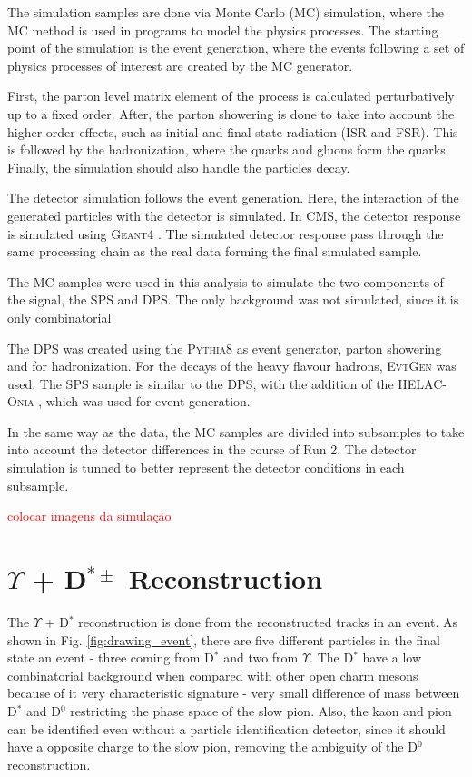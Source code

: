 The simulation samples are done via Monte Carlo (MC) simulation, where the MC method is used in programs to model the physics processes. The starting point of the simulation is the event generation, where the events following a set of physics processes of interest are created by the MC generator.

First, the parton level matrix element of the process is calculated perturbatively up to a fixed order. After, the parton showering is done to take into account the higher order effects, such as initial and final state radiation (ISR and FSR). This is followed by the hadronization, where the quarks and gluons form the quarks. Finally, the simulation should also handle the particles decay.

The detector simulation follows the event generation. Here, the interaction of the generated particles with the detector is simulated. In CMS, the detector response is simulated using \textsc{Geant4} \cite{GEANT4:2002zbu}. The simulated detector response pass through the same processing chain as the real data forming the final simulated sample.

The MC samples were used in this analysis to simulate the two components of the signal, the SPS and DPS. The only background was not simulated, since it is only combinatorial

The DPS was created using the \textsc{Pythia8} \cite{Sjostrand:2014zea} as event generator, parton showering and for hadronization. For the decays of the heavy flavour hadrons, \textsc{EvtGen} \cite{Lange:2001uf} was used. The SPS sample is similar to the DPS, with the addition of the \textsc{HELAC-Onia} \cite{Shao:2012iz, Shao:2015vga}, which was used for event generation.

In the same way as the data, the MC samples are divided into subsamples to take into account the detector differences in the course of Run 2. The detector simulation is tunned to better represent the detector conditions in each subsample.

\textcolor{red}{colocar imagens da simulação}

\section{\texorpdfstring{$\Upsilon$ + D$^{*\pm}$}{Y+D*} Reconstruction}

The $\Upsilon$ + D$^*$ reconstruction is done from the reconstructed tracks in an event. As shown in Fig. \ref{fig:drawing_event}, there are five different particles in the final state an event - three coming from D$^*$ and two from $\Upsilon$. The D$^*$ have a low combinatorial background when compared with other open charm mesons because of it very characteristic signature - very small difference of mass between D$^*$ and D$^0$ restricting the phase space of the slow pion. Also, the kaon and pion can be identified even without a particle identification detector, since it should have a opposite charge to the slow pion, removing the ambiguity of the D$^0$ reconstruction.

